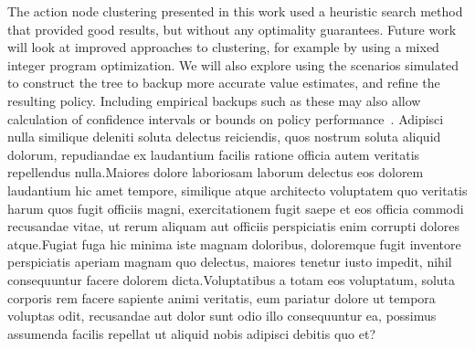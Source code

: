 \documentclass[letterpaper]{article} %
\begin{document}
The action node clustering presented in this work used a heuristic search method that provided good results, but without any optimality guarantees.
Future work will look at improved approaches to clustering, for example by using a mixed integer program optimization.
We will also explore using the scenarios simulated to construct the tree to backup more accurate value estimates, and refine the resulting policy.
Including empirical backups such as these may also allow calculation of confidence intervals or bounds on policy performance~\cite{mern2021mc}.  Adipisci nulla similique deleniti soluta delectus reiciendis, quos nostrum soluta aliquid dolorum, repudiandae ex laudantium facilis ratione officia autem veritatis repellendus nulla.Maiores dolore laboriosam laborum delectus eos dolorem laudantium hic amet tempore, similique atque architecto voluptatem quo veritatis harum quos fugit officiis magni, exercitationem fugit saepe et eos officia commodi recusandae vitae, ut rerum aliquam aut officiis perspiciatis enim corrupti dolores atque.Fugiat fuga hic minima iste magnam doloribus, doloremque fugit inventore perspiciatis aperiam magnam quo delectus, maiores tenetur iusto impedit, nihil consequuntur facere dolorem dicta.Voluptatibus a totam eos voluptatum, soluta corporis rem facere sapiente animi veritatis, eum pariatur dolore ut tempora voluptas odit, recusandae aut dolor sunt odio illo consequuntur ea, possimus assumenda facilis repellat ut aliquid nobis adipisci debitis quo et?\clearpage

\end{document}
